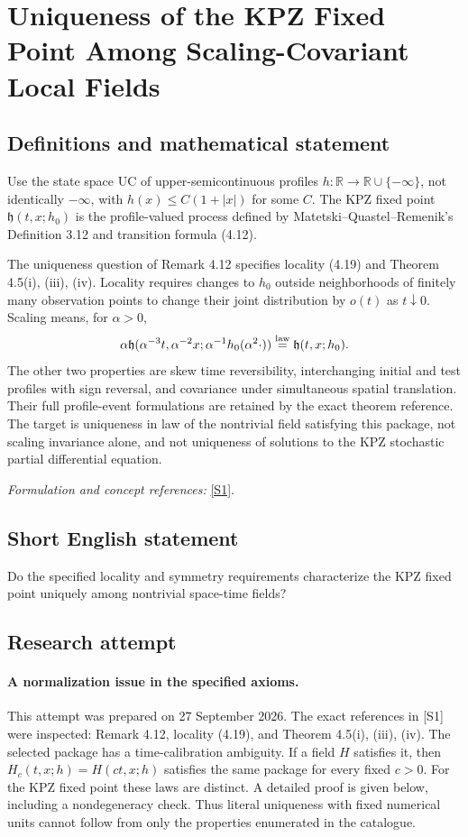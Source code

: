\documentclass[11pt]{article}
\begin{document}
\section*{\texorpdfstring{Uniqueness of the KPZ Fixed Point Among Scaling-Covariant Local Fields}{Uniqueness of the KPZ Fixed Point Among Scaling-Covariant Local Fields}}\label{30006947}
\subsection{Definitions and mathematical statement}
Use the state space $\mathrm{UC}$ of upper-semicontinuous profiles $h:{\mathbb{R}}\to{\mathbb{R}}\cup\{-\infty\}$, not identically $-\infty$, with $h(x)\le C(1+|x|)$ for some $C$. The KPZ fixed point $\mathfrak h(t,x;h_0)$ is the profile-valued process defined by Matetski--Quastel--Remenik's Definition 3.12 and transition formula (4.12).

The uniqueness question of Remark 4.12 specifies locality (4.19) and Theorem 4.5(i), (iii), (iv). Locality requires changes to $h_0$ outside neighborhoods of finitely many observation points to change their joint distribution by $o(t)$ as $t\downarrow0$. Scaling means, for $\alpha>0$,
\[
 \alpha\mathfrak h(\alpha^{-3}t,\alpha^{-2}x;
       \alpha^{-1}h_0(\alpha^2\cdot))
 \overset{\rm law}=\mathfrak h(t,x;h_0).
\]
The other two properties are skew time reversibility, interchanging initial and test profiles with sign reversal, and covariance under simultaneous spatial translation. Their full profile-event formulations are retained by the exact theorem reference. The target is uniqueness in law of the nontrivial field satisfying this package, not scaling invariance alone, and not uniqueness of solutions to the KPZ stochastic partial differential equation.
\par\smallskip\textit{Formulation and concept references:} \href{https://arxiv.org/html/1701.00018v3}{[S1]}.

\subsection{Short English statement}
Do the specified locality and symmetry requirements characterize the KPZ fixed point uniquely among nontrivial space-time fields?
\subsection{Research attempt}
\paragraph{A normalization issue in the specified axioms.}
This attempt was prepared on 27 September 2026. The exact references in
[S1] were inspected: Remark 4.12, locality (4.19), and Theorem 4.5(i),
(iii), (iv). The selected package has a time-calibration ambiguity.
If a field $H$ satisfies it, then $H_c(t,x;h)=H(ct,x;h)$ satisfies the
same package for every fixed $c>0$. For the KPZ fixed point these laws
are distinct. A detailed proof is given below, including a nondegeneracy
check. Thus literal uniqueness with fixed numerical units cannot follow
from only the properties enumerated in the catalogue.
\end{document}
